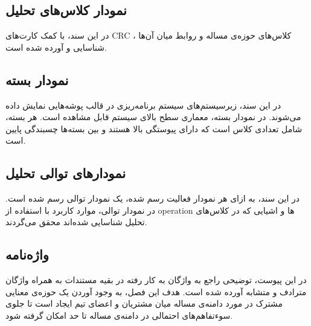 \subsection{نمودار کلاس‌های تحلیل}
در این سند، با کمک  کارت‌های CRC ، کلاس‌های حوزه‌ی مساله و روابط میان آن‌ها شناسایی و آورده شده است.


\subsection{نمودار بسته}
در این سند، زیرسیستم‌های سیستم برنامه‌ریزی در قالب پوشه‌هایی نمایش داده می‌شوند. در نمودار بسته، معماری سطح بالای سیستم قابل مشاهده است. هر بسته، شامل تعدادی کلاس است که دارای پیوستگی
بالا هستند و بین بسته‌ها چسبندگی
پایین است.

\subsection{نمودارهای توالی تحلیل}
در این سند، به ازای هر نمودار فعالیت رسم شده، یک نمودار توالی رسم شده است. در نمودار توالی، موارد کاربرد با استفاده از operation ها و اشیایی که در کلاس‌های تحلیل شناسایی شده‌اند محقق می‌گردند.

\subsection{واژه‌نامه}
در این پیوست، توضیحی راجع به واژگان به کار رفته در بقیه مستندات به همراه واژگان مترادف و متشابه آورده شده است. هدف این فصل، به وجود آوردن یک حوزه‌ی معنایی مشترک در مورد دامنه‌ی مساله میان مشتریان و اعضای تیم ایجاد است  تا جلوی سوء‌تفاهم‌های احتمالی در دامنه‌ی مساله تا حد امکان گرفته شود.


\newpage
